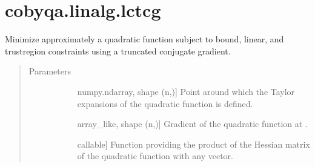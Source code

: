 \documentclass[letterpaper,10pt,english]{sphinxmanual}
\begin{document}
\begin{fulllineitems}
\begin{quote}
\begin{description}
\begin{description}
\end{description}

\end{description}\end{quote}

\end{fulllineitems}



\section{cobyqa.linalg.lctcg}
\label{\detokenize{refs/generated/cobyqa.linalg.lctcg:cobyqa-linalg-lctcg}}\label{\detokenize{refs/generated/cobyqa.linalg.lctcg::doc}}

\begin{fulllineitems}
\label{\detokenize{refs/generated/cobyqa.linalg.lctcg:cobyqa.linalg.lctcg}}
\sphinxAtStartPar
Minimize approximately a quadratic function subject to bound, linear, and
trust\sphinxhyphen{}region constraints using a truncated conjugate gradient.
\begin{quote}\begin{description}
\item[{Parameters}] \leavevmode\begin{description}
\item[{}] \leavevmode{[}numpy.ndarray, shape (n,){]}
\sphinxAtStartPar
Point around which the Taylor expansions of the quadratic function is
defined.

\item[{}] \leavevmode{[}array\_like, shape (n,){]}
\sphinxAtStartPar
Gradient of the quadratic function at .

\item[{}] \leavevmode{[}callable{]}
\sphinxAtStartPar
Function providing the product of the Hessian matrix of the quadratic
function with any vector.
\begin{quote}


\end{quote}
\end{description}
\end{description}
\end{quote}
\end{fulllineitems}
\end{document}
